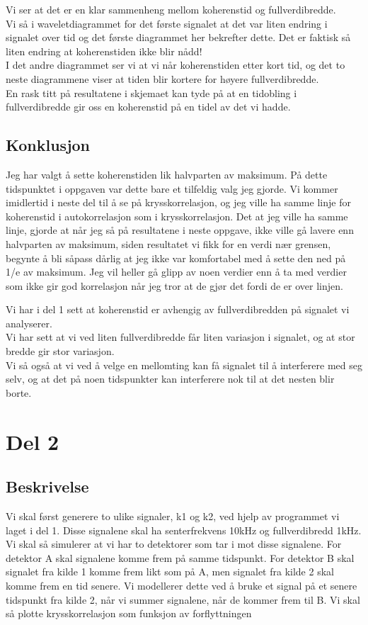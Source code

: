 \documentclass[12pt,norsk,a4paper]{article}
\begin{document}
Vi ser at det er en klar sammenheng mellom koherenstid og fullverdibredde.\\
Vi så i waveletdiagrammet for det første signalet at det var liten endring i signalet over tid og det første diagrammet her bekrefter dette. Det er faktisk så liten endring at koherenstiden ikke blir nådd!\\
I det andre diagrammet ser vi at vi når koherenstiden etter kort tid, og det to neste diagrammene viser at tiden blir kortere for høyere fullverdibredde.\\
En rask titt på resultatene i skjemaet kan tyde på at en tidobling i fullverdibredde gir oss en koherenstid på en tidel av det vi hadde.

\subsection{Konklusjon}
Jeg har valgt å sette koherenstiden lik halvparten av maksimum. På dette tidspunktet i oppgaven var dette bare et tilfeldig valg jeg gjorde. Vi kommer imidlertid i neste del til å se på krysskorrelasjon, og jeg ville ha samme linje for koherenstid i autokorrelasjon som i krysskorrelasjon. Det at jeg ville ha samme linje, gjorde at når jeg så på resultatene i neste oppgave, ikke ville gå lavere enn halvparten av maksimum, siden resultatet vi fikk for en verdi nær grensen, begynte å bli såpass dårlig at jeg ikke var komfortabel med å sette den ned på 1/e av maksimum. Jeg vil heller gå glipp av noen verdier enn å ta med verdier som ikke gir god korrelasjon når jeg tror at de gjør det fordi de er over linjen.

Vi har i del 1 sett at koherenstid er avhengig av fullverdibredden på signalet vi analyserer.\\
Vi har sett at vi ved liten fullverdibredde får liten variasjon i signalet, og at stor bredde gir stor variasjon.\\
Vi så også at vi ved å velge en mellomting kan få signalet til å interferere med seg selv, og at det på noen tidspunkter kan interferere nok til at det nesten blir borte.

\section{Del 2}


\subsection{Beskrivelse}
Vi skal først generere to ulike signaler, k1 og k2,  ved hjelp av programmet vi laget i del 1.
Disse signalene skal ha senterfrekvens  10kHz og fullverdibredd 1kHz.
Vi skal så simulerer at vi har to detektorer som tar i mot disse signalene. 
For detektor A skal signalene komme frem på samme tidspunkt.
For detektor B skal signalet fra kilde 1 komme frem likt som på A, men signalet fra kilde 2 skal komme frem en tid senere. 
Vi modellerer dette ved å bruke et signal på et senere tidspunkt fra kilde 2, når vi summer signalene, når de kommer frem til B.
Vi skal så plotte krysskorrelasjon som funksjon av forflyttningen
\end{document}
